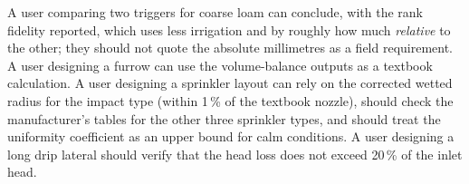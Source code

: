A user comparing two triggers for coarse loam can conclude, with the rank fidelity reported, which uses less irrigation and by roughly how much \emph{relative} to the other; they should not quote the absolute millimetres as a field requirement. A user designing a furrow can use the volume-balance outputs as a textbook calculation. A user designing a sprinkler layout can rely on the corrected wetted radius for the impact type (within 1\,\% of the textbook nozzle), should check the manufacturer's tables for the other three sprinkler types, and should treat the uniformity coefficient as an upper bound for calm conditions. A user designing a long drip lateral should verify that the head loss does not exceed 20\,\% of the inlet head.

